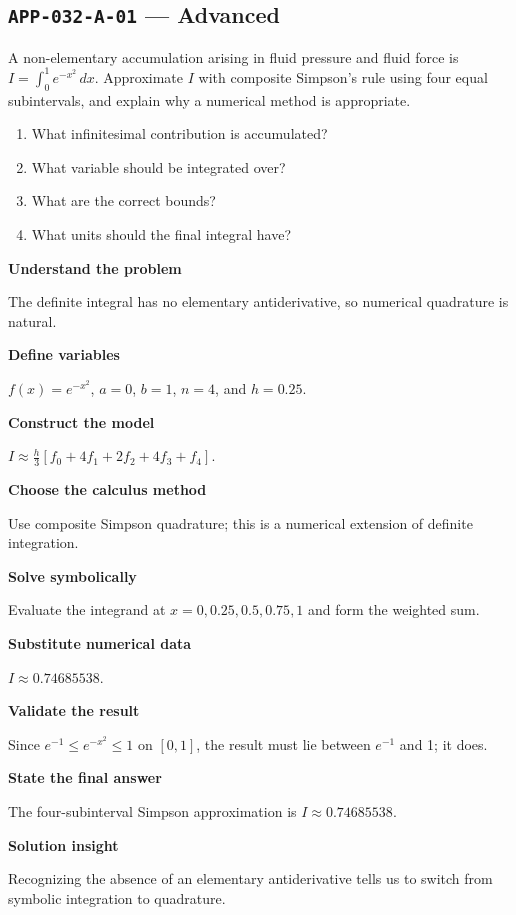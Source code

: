 \documentclass[11pt]{book}
\newcommand{\pid}[1]{\texttt{#1}}
\begin{document}
\subsection*{\pid{APP-032-A-01} — Advanced}
\begin{problembox}
A non-elementary accumulation arising in fluid pressure and fluid force is $I=\int_0^1 e^{-x^2}\,dx$. Approximate $I$ with composite Simpson's rule using four equal subintervals, and explain why a numerical method is appropriate.
\end{problembox}
\begin{promptbox}\begin{enumerate}
\item What infinitesimal contribution is accumulated?
\item What variable should be integrated over?
\item What are the correct bounds?
\item What units should the final integral have?
\end{enumerate}\end{promptbox}
\begin{solutionbox}
\textbf{Understand the problem}\par The definite integral has no elementary antiderivative, so numerical quadrature is natural.\par\medskip
\textbf{Define variables}\par $f(x)=e^{-x^2}$, $a=0$, $b=1$, $n=4$, and $h=0.25$.\par\medskip
\textbf{Construct the model}\par $I\approx\frac{h}{3}[f_0+4f_1+2f_2+4f_3+f_4]$.\par\medskip
\textbf{Choose the calculus method}\par Use composite Simpson quadrature; this is a numerical extension of definite integration.\par\medskip
\textbf{Solve symbolically}\par Evaluate the integrand at $x=0,0.25,0.5,0.75,1$ and form the weighted sum.\par\medskip
\textbf{Substitute numerical data}\par $I\approx 0.74685538$.\par\medskip
\textbf{Validate the result}\par Since $e^{-1}\le e^{-x^2}\le1$ on $[0,1]$, the result must lie between $e^{-1}$ and 1; it does.\par\medskip
\textbf{State the final answer}\par The four-subinterval Simpson approximation is $I\approx 0.74685538$.\par\medskip
\textbf{Solution insight}\par Recognizing the absence of an elementary antiderivative tells us to switch from symbolic integration to quadrature.\par\medskip
\end{solutionbox}
\end{document}
